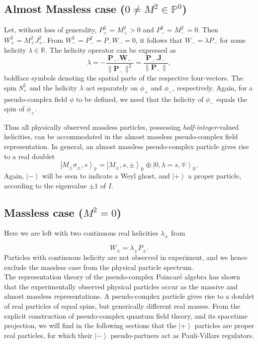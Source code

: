 \documentclass[a4paper,aps,prd,showkeys,showpacs,superscriptaddress,preprint]{revtex4}
\newcommand{\pc}{\mathbb{P}}
\newcommand{\reals}{\mathbb{R}}
\begin{document}
\subsection{Almost Massless case ($0 \neq M^2 \in \pc^0$)}
Let, without loss of generality, $P_+^2 = M_+^2 > 0$ and $P_-^2 = M_-^2
= 0$. Then $W_+^2 = M_+^2 J_+^2$. From $W_-^2=P_-^2=P_- W_- = 0$, it
follows that $W_- = \lambda P_-$ for some helicity $\lambda \in
\reals$. The helicity operator can be expressed as
\begin{equation}
  \lambda = - \frac{\mathbf{P}_- .\mathbf{W}_-}{\|\mathbf{P}_-\|^2} =
  \frac{\mathbf{P}_-.\mathbf{J}_-}{\|\mathbf{P}_-\|},
\end{equation}
boldface symbols denoting the spatial parts of the respective four-vectors.  
The spin $S_+^2$ and the helicity $\lambda$ act separately on $\phi_+$
and $\phi_-$, respectively. Again, for a pseudo-complex field $\phi$
to be defined, we need that the helicity of $\phi_-$ equals the spin
of $\phi_+$. 

Thus all physically observed massless particles, possessing
\textsl{half-integer}-valued helicities, can be accommodated in the almost
massless pseudo-complex field representation.
In general, an almost massless pseudo-complex particle gives rise to a
real doublet
\begin{equation}
  \left|M_\pm\sigma_\pm, s\right>_\pc = \left|M_\pm, s, \pm\right>_\reals \oplus \left|0, \lambda=s, \mp\right>_\reals.
\end{equation}
Again, $\left|-\right>$ will be seen to indicate a Weyl ghost, and $\left|+\right>$ a proper
particle, according to the eigenvalue $\pm 1$ of $I$.

\subsection{Massless case ($M^2 = 0$)}
Here we are left with two continuous real helicities $\lambda_\pm$ from

\begin{equation}
  W_\pm = \lambda_\pm P_\pm.
\end{equation}
Particles with continuous helicity are not observed in experiment, and we hence
exclude the massless case from the physical particle spectrum.\\

The representation theory of the pseudo-complex Poincar\'e algebra has
shown that the experimentally observed physical particles occur as the massive and almost
massless representations. A pseudo-complex particle gives rise to a
doublet of real particles of equal spins, but generically different
real masses. From the explicit construction of pseudo-complex quantum
field theory, and its spacetime projection, we will find in the
following sections that the $\left|+\right>$ particles are proper real
particles, for which their $\left|-\right>$ pseudo-partners act as
Pauli-Villars regulators.
\end{document}
